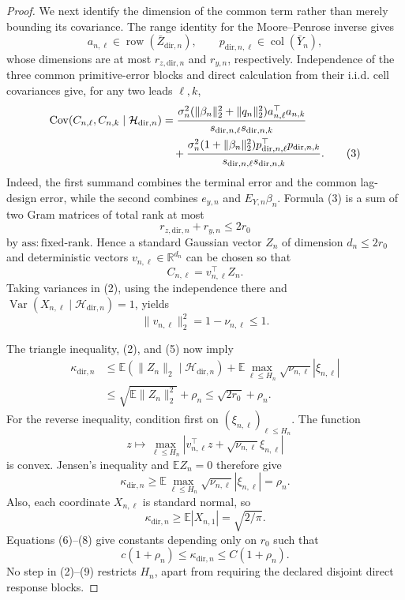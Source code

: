 \documentclass{article}
\begin{document}
\begin{proof}
We next identify the dimension of the common term rather than merely bounding its covariance.  The range identity for the Moore--Penrose inverse gives
\[
 a_{n,\ell}\in\operatorname{row}(\bar Z_{\mathrm{dir},n}),
 \qquad
 p_{\mathrm{dir},n,\ell}\in
 \operatorname{col}(\bar Y_n),
\]
whose dimensions are at most \(r_{z,\mathrm{dir},n}\) and \(r_{y,n}\), respectively.  Independence of the three common primitive-error blocks and direct calculation from their i.i.d. cell covariances give, for any two leads \(\ell,k\),
\[
\begin{aligned}
 \operatorname{Cov}(C_{n,\ell},C_{n,k}\mid\mathcal H_{\mathrm{dir},n})
 &={\sigma_n^2(\|\beta_n\|_2^2+\|q_n\|_2^2)
       a_{n,\ell}^{\top}a_{n,k}
    \over s_{\mathrm{dir},n,\ell}s_{\mathrm{dir},n,k}}\\
 &\quad+{\sigma_n^2(1+\|\beta_n\|_2^2)
       p_{\mathrm{dir},n,\ell}^{\top}p_{\mathrm{dir},n,k}
    \over s_{\mathrm{dir},n,\ell}s_{\mathrm{dir},n,k}}.
 \tag{3}
\end{aligned}
\]
Indeed, the first summand combines the terminal error and the common lag-design error, while the second combines \(e_{y,n}\) and \(E_{Y,n}\beta_n\).  Formula (3) is a sum of two Gram matrices of total rank at most
\[
 r_{z,\mathrm{dir},n}+r_{y,n}\le2r_0
 \tag{4}
\]
by \(\mathrm{ass{:}fixed\mbox{-}rank}\).  Hence a standard Gaussian vector \(Z_n\) of dimension \(d_n\le2r_0\) and deterministic vectors \(v_{n,\ell}\in\mathbb R^{d_n}\) can be chosen so that
\[
 C_{n,\ell}=v_{n,\ell}^{\top}Z_n.
\]
Taking variances in (2), using the independence there and \(\operatorname{Var}(X_{n,\ell}\mid\mathcal H_{\mathrm{dir},n})=1\), yields
\[
 \|v_{n,\ell}\|_2^2=1-\nu_{n,\ell}\le1.
 \tag{5}
\]

The triangle inequality, (2), and (5) now imply
\[
\begin{aligned}
 \kappa_{\mathrm{dir},n}
 &\le \mathbb E(\|Z_n\|_2\mid\mathcal H_{\mathrm{dir},n})
 +\mathbb E\max_{\ell\le H_n}
       \sqrt{\nu_{n,\ell}}|\xi_{n,\ell}|\\
 &\le \sqrt{\mathbb E\|Z_n\|_2^2}+\rho_n
 \le\sqrt{2r_0}+\rho_n.
 \tag{6}
\end{aligned}
\]
For the reverse inequality, condition first on \((\xi_{n,\ell})_{\ell\le H_n}\).  The function
\[
 z\longmapsto\max_{\ell\le H_n}
 \left|v_{n,\ell}^{\top}z+\sqrt{\nu_{n,\ell}}\xi_{n,\ell}\right|
\]
is convex.  Jensen's inequality and \(\mathbb E Z_n=0\) therefore give
\[
 \kappa_{\mathrm{dir},n}\ge
 \mathbb E\max_{\ell\le H_n}
 \sqrt{\nu_{n,\ell}}|\xi_{n,\ell}|=\rho_n.
 \tag{7}
\]
Also, each coordinate \(X_{n,\ell}\) is standard normal, so
\[
 \kappa_{\mathrm{dir},n}\ge
 \mathbb E|X_{n,1}|=\sqrt{2/\pi}.
 \tag{8}
\]
Equations (6)--(8) give constants depending only on \(r_0\) such that
\[
 c(1+\rho_n)\le\kappa_{\mathrm{dir},n}
 \le C(1+\rho_n).
 \tag{9}
\]
No step in (2)--(9) restricts \(H_n\), apart from requiring the declared disjoint direct response blocks.


\end{proof}
\end{document}
